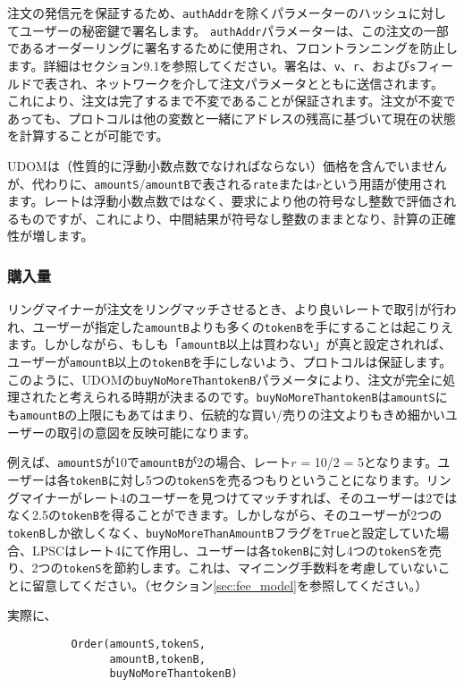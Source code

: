 \documentclass{article}
\begin{document}
\begin{multicols}{2}
注文の発信元を保証するため、\verb|authAddr|を除くパラメーターのハッシュに対してユーザーの秘密鍵で署名します。 \verb|authAddr|パラメーターは、この注文の一部であるオーダーリングに署名するために使用され、フロントランニングを防止します。詳細はセクション9.1を参照してください。署名は、\verb|v|、\verb|r|、および\verb|s|フィールドで表され、ネットワークを介して注文パラメータとともに送信されます。 これにより、注文は完了するまで不変であることが保証されます。注文が不変であっても、プロトコルは他の変数と一緒にアドレスの残高に基づいて現在の状態を計算することが可能です。


UDOMは（性質的に浮動小数点数でなければならない）価格を含んでいませんが、代わりに、\verb|amountS|/\verb|amountB|で表される\verb|rate|または$r$という用語が使用されます。レートは浮動小数点数ではなく、要求により他の符号なし整数で評価されるものですが、これにより、中間結果が符号なし整数のままとなり、計算の正確性が増します。


\subsubsection{購入量}

リングマイナーが注文をリングマッチさせるとき、より良いレートで取引が行われ、ユーザーが指定した\verb|amountB|よりも多くの\verb|tokenB|を手にすることは起こりえます。しかしながら、もしも「\verb|amountB|以上は買わない」が真と設定されれば、ユーザーが\verb|amountB|以上の\verb|tokenB|を手にしないよう、プロトコルは保証します。このように、UDOMの\verb|buyNoMoreThantokenB|パラメータにより、注文が完全に処理されたと考えられる時期が決まるのです。\verb|buyNoMoreThantokenB|は\verb|amountS|にも\verb|amountB|の上限にもあてはまり、伝統的な買い/売りの注文よりもきめ細かいユーザーの取引の意図を反映可能になります。

例えば、\verb|amountS|が10で\verb|amountB|が2の場合、レート$r$ = 10/2 = 5となります。ユーザーは各\verb|tokenB|に対し5つの\verb|tokenS|を売るつもりということになります。リングマイナーがレート4のユーザーを見つけてマッチすれば、そのユーザーは2ではなく2.5の\verb|tokenB|を得ることができます。しかしながら、そのユーザーが2つの\verb|tokenB|しか欲しくなく、\verb|buyNoMoreThanAmountB|フラグを\verb|True|と設定していた場合、LPSCはレート4にて作用し、ユーザーは各\verb|tokenB|に対し4つの\verb|tokenS|を売り、2つの\verb|tokenS|を節約します。これは、マイニング手数料を考慮していないことに留意してください。（セクション\ref{sec:fee_model}を参照してください。）

実際に、


\begin{verbatim}
	      Order(amountS,tokenS,
	            amountB,tokenB,
	            buyNoMoreThantokenB)
\end{verbatim}


\end{multicols}
\end{document}
